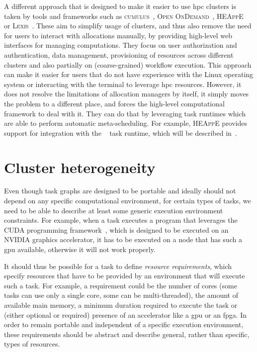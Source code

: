 A different approach that is designed to make it easier to use \gls{hpc} clusters is
taken by tools and frameworks such as \textsc{cumulus}~\cite{cumulus},
\textsc{Open OnDemand}~\cite{openondemand}, \textsc{HEAppE}~\cite{heappe} or
\textsc{Lexis}~\cite{lexis}. These aim to simplify usage of clusters, and thus
also remove the need for users to interact with allocations manually, by providing high-level web
interfaces for managing computations. They focus on user authorization and authentication, data
management, provisioning of resources across different clusters and also partially on
(coarse-grained) workflow execution. This approach can make it easier for users that do not have
experience with the Linux operating system or interacting with the terminal to leverage
\gls{hpc} resources. However, it does not resolve the limitations of allocation
managers by itself, it simply moves the problem to a different place, and forces the high-level
computational framework to deal with it. They can do that by leveraging task runtimes which are
able to perform automatic meta-scheduling. For example, \textsc{HEAppE} provides support
for integration with the \hyperqueue{}~\cite{heappe_hq} task runtime, which will
be described in~.

\section{Cluster heterogeneity}
\label{challenge:heterogeneity}
Even though task graphs are designed to be portable and ideally should not depend on any specific
computational environment, for certain types of tasks, we need to be able to describe at least some
generic execution environment constraints. For example, when a task executes a program that
leverages the CUDA programming framework~\cite{cuda}, which is designed to be executed
on an NVIDIA graphics accelerator, it has to be executed on a node that has such a
\gls{gpu} available, otherwise it will not work properly.

It should thus be possible for a task to define \emph{resource requirements}, which specify resources
that have to be provided by an environment that will execute such a task. For example, a
requirement could be the number of cores (some tasks can use only a single core, some can be
multi-threaded), the amount of available main memory, a minimum duration required to execute the
task or (either optional or required) presence of an accelerator like a \gls{gpu} or
an \gls{fpga}. In order to remain portable and independent of a specific execution
environment, these requirements should be abstract and describe general, rather than specific,
types of resources.

